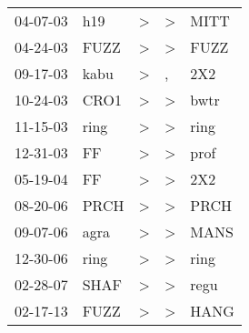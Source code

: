 \begin{supertabular}{lllll}
 04-07-03 &   h19 &  \textgreater &  \textgreater &  MITT \\
 04-24-03 &  FUZZ &  \textgreater &  \textgreater &  FUZZ \\
 09-17-03 &  kabu &  \textgreater &             , &   2X2 \\
 10-24-03 &  CRO1 &  \textgreater &  \textgreater &  bwtr \\
 11-15-03 &  ring &  \textgreater &  \textgreater &  ring \\
 12-31-03 &    FF &  \textgreater &  \textgreater &  prof \\
 05-19-04 &    FF &  \textgreater &  \textgreater &   2X2 \\
 08-20-06 &  PRCH &  \textgreater &  \textgreater &  PRCH \\
 09-07-06 &  agra &  \textgreater &  \textgreater &  MANS \\
 12-30-06 &  ring &  \textgreater &  \textgreater &  ring \\
 02-28-07 &  SHAF &  \textgreater &  \textgreater &  regu \\
 02-17-13 &  FUZZ &  \textgreater &  \textgreater &  HANG \\
\end{supertabular}
